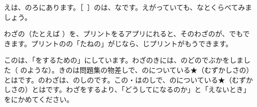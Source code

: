 {  \noindent {}えは、のろにあります。［\ ］のは、なです。えがっていても、なとくらべてみましょう。\par\vspace{3mm}
  \begin{tcolorbox}[enhanced, colback=white, colframe=bkDeep, boxrule=1pt, arc=2mm, left=2mm, right=2mm, top=1mm, bottom=1mm,
    fonttitle=\sffamily\bfseries\small, coltitle=white, colbacktitle=bkDeep, title={プリントを\R{作}{つく}るアプリ}]
  わざの（たとえば \mqhowtowaza）を、プリントをるアプリにれると、そのわざのが、でもできます。プリントのの「たねの」がじなら、じプリントがもうできます。
  \end{tcolorbox}\par\vspace{3mm}
  \par
  {\small このは、「をするための」\bkvol{}にしています。わざのきには、のどのでぶかをしました（ のような）。\ifmqnostartwo{}きのは問題集の物差しで、のについている★（むずかしさの）とはです。\else {}のわざは、\bkvol{}のしのです。この・はのしで、のについている★（むずかしさの）とはです。\fi わざをするより、「どうしてになるのか」と「えないとき」をにかめてください。}\par
  \clearpage}
\newcommand\mqlistpages{%
  \bksetrunning{}{\R{問題集}{もん|だい|しゅう}\hspace{0.5em}\R{第}{だい}\bkvol\R{巻}{かん}}{\ifnum\bkvol=1 わざの いちらん\else わざの\R{一覧}{いち|らん}\fi}%
  \noindent{\sffamily\bfseries\Large\color{bkDeep}\ifnum\bkvol=1 わざの いちらん\else わざの\R{一覧}{いち|らん}\fi}\par\vspace{1mm}
  \noindent{\small\ifnum\bkvol=1 ばんごうを アプリに \R{入}{い}れると、 その わざの プリントが できます。 \mqstars{2}は すこし むずかしい わざ。\else \R{番号}{ばん|ごう}をアプリに\R{入}{い}れると、そのわざのプリントができます。\ifmqnostartwo\else\mqstars{2}は\R{少}{すこ}しむずかしいわざです。\fi\fi}\par\vspace{1mm}
  \clearpage}
